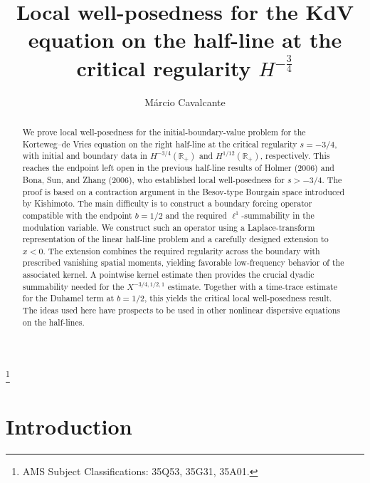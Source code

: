 \documentclass[10pt,reqno]{amsart}
\theoremstyle{remark}
\numberwithin{equation}{section}
\begin{document}
\title[KdV on the half-line at $H^{-3/4}$]{Local well-posedness for the KdV equation on the half-line at the critical regularity $H^{-\frac34}$}

\author{Márcio Cavalcante}
\address{Instituto de Matemática\\ Universidade Federal de Alagoas, Brazil}

\thanks{AMS Subject Classifications: 35Q53, 35G31, 35A01.}


\maketitle

\begin{abstract}
We prove local well-posedness for the initial-boundary-value problem for the Korteweg--de Vries equation on the right half-line at the critical regularity $s=-3/4$, with initial and boundary data in $H^{-3/4}(\mathbb R_+)$ and $H^{1/12}(\mathbb R_+)$, respectively. This reaches the endpoint left open in the previous half-line results of Holmer (2006) and Bona, Sun, and Zhang (2006), who established local well-posedness for $s>-3/4$. The proof is based on a contraction argument in the Besov-type Bourgain space introduced by Kishimoto. The main difficulty is to construct a boundary forcing operator compatible with the endpoint $b=1/2$ and the required $\ell^1$-summability in the modulation variable. We construct such an operator using a Laplace-transform representation of the linear half-line problem and a carefully designed extension to $x<0$. The extension combines the required regularity across the boundary with prescribed vanishing spatial moments, yielding favorable low-frequency behavior of the associated kernel. A pointwise kernel estimate then provides the crucial dyadic summability needed for the $X^{-3/4,1/2,1}$ estimate. Together with a time-trace estimate for the Duhamel term at $b=1/2$, this yields the critical local well-posedness result. The ideas used here have prospects to be used in other nonlinear dispersive equations on the half-lines.
\end{abstract}



\section{Introduction}
\end{document}
